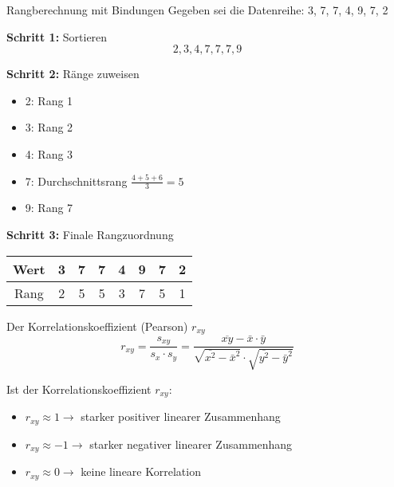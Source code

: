 \begin{example2}{Rangberechnung mit Bindungen}
Gegeben sei die Datenreihe: 3, 7, 7, 4, 9, 7, 2

\textbf{Schritt 1:} Sortieren
$$2, 3, 4, 7, 7, 7, 9$$

\textbf{Schritt 2:} Ränge zuweisen
\begin{itemize}
    \item 2: Rang 1
    \item 3: Rang 2
    \item 4: Rang 3
    \item 7: Durchschnittsrang $\frac{4+5+6}{3} = 5$
    \item 9: Rang 7
\end{itemize}

\textbf{Schritt 3:} Finale Rangzuordnung
\begin{center}
\begin{tabular}{|c|c|c|c|c|c|c|c|}
\hline
Wert & 3 & 7 & 7 & 4 & 9 & 7 & 2 \\
\hline
Rang & 2 & 5 & 5 & 3 & 7 & 5 & 1 \\
\hline
\end{tabular}
\end{center}
\end{example2}

\begin{definition}{Der Korrelationskoeffizient (Pearson) $r_{xy}$}\\
$$r_{xy} = \frac{s_{xy}}{s_x \cdot s_y} = \frac{\overline{xy} - \bar{x} \cdot \bar{y}}{\sqrt{\overline{x^2} - \bar{x}^2} \cdot \sqrt{\overline{y^2} - \bar{y}^2}}$$

Ist der Korrelationskoeffizient $r_{xy}$:
\begin{itemize}
  \item $r_{xy} \approx 1 \rightarrow$ starker positiver linearer Zusammenhang
  \item $r_{xy} \approx -1 \rightarrow$ starker negativer linearer Zusammenhang
  \item $r_{xy} \approx 0 \rightarrow$ keine lineare Korrelation
\end{itemize}
\end{definition}

